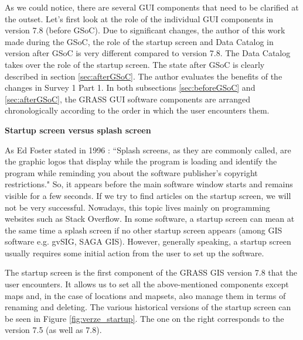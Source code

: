 \documentclass[a4paper,10pt,twoside]{article}
\begin{document}
\noindent As we could notice, there are several GUI components that
need to be clarified at the outset. Let's first look at the role of
the individual GUI components in version 7.8 (before GSoC). Due to
significant changes, the author of this work made during the GSoC, the
role of the startup screen and Data Catalog in version after GSoC
is very different compared to version 7.8. The Data Catalog takes over
the role of the startup screen. The state after GSoC is clearly
described in section \ref{sec:afterGSoC}. The author evaluates
the benefits of the changes in Survey 1 Part 1. In
both subsections \ref{sec:beforeGSoC} and \ref{sec:afterGSoC}, the
GRASS GUI software components are arranged chronologically according
to the order in which the user encounters them.

\bigskip
\noindent \textbf {Startup screen versus splash screen}

\noindent As Ed Foster stated in 1996 \cite{foster}: ``Splash screens,
as they are commonly called, are the graphic logos that display while
the program is loading and identify the program while reminding you
about the software publisher's copyright restrictions." So, it appears
before the main software window starts and remains visible for a few
seconds. If we try to find articles on the startup screen, we will not
be very successful. Nowadays, this topic lives mainly on programming
websites such as Stack Overflow. In some software, a startup screen can
mean at the same time a splash screen if no other startup screen
appears (among GIS software e.g. gvSIG, SAGA GIS). However, generally
speaking, a startup screen usually requires some initial action from
the user to set up the software.

The startup screen is the first component of the GRASS GIS version 7.8
that the user encounters. It allows us to set all the above-mentioned components
except maps and, in the case of locations and mapsets, also manage
them in terms of renaming and deleting. The various historical
versions of the startup screen can be seen in Figure
\ref{fig:verze_startup}. The one on the right corresponds to the version
7.5 (as well as 7.8).
\end{document}
